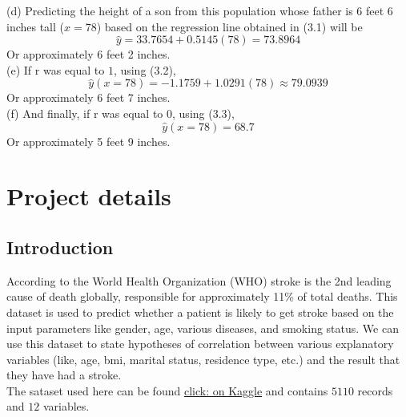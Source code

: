 \documentclass[boxes, qed]{homework}
\begin{document}
\begin{solution}
  (d) Predicting the height of a son from this population whose father is 6 feet 6 inches tall ($x=78$)
  based on the regression line obtained in (3.1) will be
  $$\hat{y} = 33.7654+0.5145(78) = 73.8964$$
  Or approximately 6 feet 2 inches.\\
  
  (e) If r was equal to $1$, using (3.2),
  $$\hat{y}(x=78) = -1.1759 + 1.0291(78) \approx 79.0939$$
  Or approximately 6 feet 7 inches.\\
  
  (f) And finally, if r was equal to $0$, using (3.3),
  $$\hat{y}(x=78) = 68.7$$
  Or approximately 5 feet 9 inches.
\end{solution}

\pagebreak

\section*{Project details}
\subsection*{Introduction}
According to the World Health Organization (WHO) stroke is the 2nd leading cause of death globally, 
responsible for approximately 11\% of total deaths. This dataset is used to predict whether a patient
is likely to get stroke based on the input parameters like gender, age, various diseases, and smoking 
status. We can use this dataset to state hypotheses of correlation between various explanatory
variables (like, age, bmi, marital status, residence type, etc.) and the result that they have had
a stroke.\\
The sataset used here can be found 
\href{https://www.kaggle.com/fedesoriano/stroke-prediction-dataset?select=healthcare-dataset-stroke-data.csv}
{click: on Kaggle} and contains $5110$ records and $12$ variables.
\end{document}
